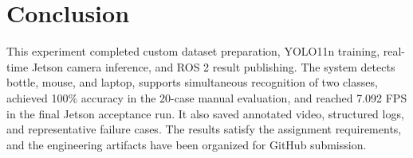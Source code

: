 \documentclass[a4paper,conference]{IEEEtran}
\begin{document}
\section{Conclusion}

This experiment completed custom dataset preparation, YOLO11n training, real-time Jetson camera inference, and ROS 2 result publishing. The system detects bottle, mouse, and laptop, supports simultaneous recognition of two classes, achieved 100\% accuracy in the 20-case manual evaluation, and reached 7.092 FPS in the final Jetson acceptance run. It also saved annotated video, structured logs, and representative failure cases. The results satisfy the assignment requirements, and the engineering artifacts have been organized for GitHub submission.
\end{document}
